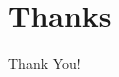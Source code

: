 \documentclass[compress,ignorenonframetext,aspectratio=1610]{beamer}
\newcommand\blfootnote[1]{%
  \begingroup
  \renewcommand\thefootnote{}\footnote{\tiny{#1}}%
  \addtocounter{footnote}{-1}%
  \endgroup
}
\begin{document}
\section{Thanks}





			




	\begin{frame}{}
		\begin{center}
			{\fontsize{40}{50}\selectfont Thank You!}
		\end{center}
	\end{frame}
\end{document}
